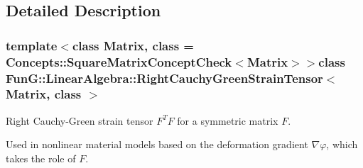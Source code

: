 \subsection{Detailed Description}
\subsubsection*{template$<$class Matrix, class = Concepts\-::\-Square\-Matrix\-Concept\-Check$<$\-Matrix$>$$>$class Fun\-G\-::\-Linear\-Algebra\-::\-Right\-Cauchy\-Green\-Strain\-Tensor$<$ Matrix, class $>$}

Right Cauchy-\/\-Green strain tensor $ F^T F $ for a symmetric matrix $ F $. 

Used in nonlinear material models based on the deformation gradient $\nabla\varphi$, which takes the role of $F$. 

